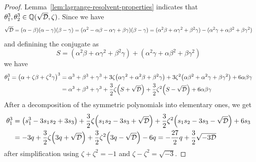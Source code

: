 \begin{proof}
    Lemma~\ref{lem:lagrange-resolvent-properties} indicates that
    \(\theta_1^3,\theta_2^3 \in \mathbb{Q}(\sqrt{\mathcal{D}},\zeta)\).
    Since we have
    \begin{equation*}
        \sqrt{\mathcal{D}} = (\alpha-\beta)(\alpha-\gamma)(\beta-\gamma)
        = (\alpha^2 - \alpha\beta - \alpha\gamma + \beta\gamma)(\beta - \gamma)
        = (\alpha^2\beta + \alpha\gamma^2 + \beta^2\gamma) - (\alpha^2\gamma + \alpha\beta^2 + \beta\gamma^2)
    \end{equation*}
    and definining the conjugate as
    \[S = (\alpha^2\beta + \alpha\gamma^2 + \beta^2\gamma) + (\alpha^2\gamma + \alpha\beta^2 + \beta\gamma^2)\]
    we have
    \begin{align*}
        \theta_1^3 = \pqty{\alpha + \zeta\beta + \zeta^2\gamma}^3
        &= \alpha^3 + \beta^3 + \gamma^3 + 3\zeta\pqty{\alpha\gamma^2 + \alpha^2\beta + \beta^2\gamma}
        + 3\zeta^2\pqty{\alpha\beta^2 + \alpha^2\gamma + \beta\gamma^2} + 6\alpha\beta\gamma \\
        &= \alpha^3 + \beta^3 + \gamma^3 + \frac{3}{2}\zeta\pqty{S+\sqrt{\mca{D}}}
        + \frac{3}{2}\zeta^2\pqty{S-\sqrt{\mca{D}}} + 6\alpha\beta\gamma
    \end{align*}
    After a decomposition of the symmetric polynomials into elementary ones, we get
    \begin{align*}
        \theta_1^3 &= \pqty{s_1^3 - 3s_1s_2 + 3s_3} + \frac{3}{2}\zeta\pqty{s_1s_2 - 3s_3 + \sqrt{\mca{D}}}
        + \frac{3}{2}\zeta^2\pqty{s_1s_2 - 3s_3 - \sqrt{\mca{D}}} + 6s_3 \\
        &= -3q + \frac{3}{2}\zeta\pqty{3q + \sqrt{\mca{D}}} + \frac{3}{2}\zeta^2\pqty{3q - \sqrt{\mca{D}}} - 6q
        = -\frac{27}{2}q + \frac{3}{2}\sqrt{-3\mca{D}}
    \end{align*}
    after simplification using \(\zeta+\zeta^2 = -1\) and \(\zeta-\zeta^2 = \sqrt{-3}\).

    

\end{proof}
